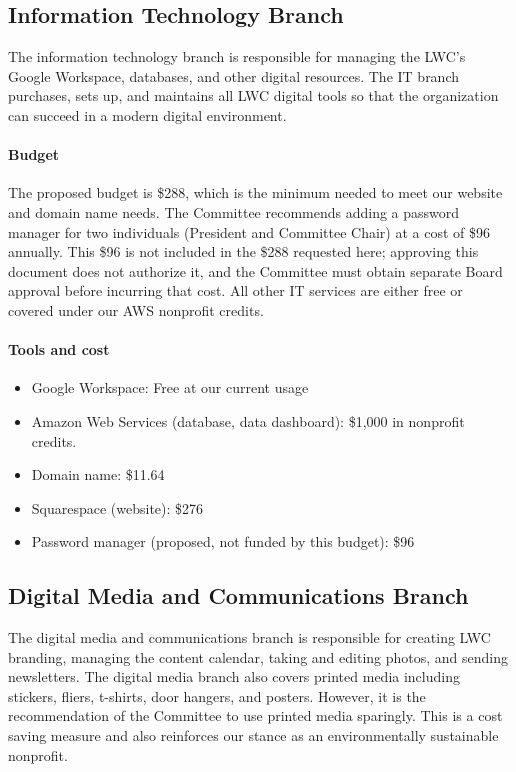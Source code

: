\documentclass[letterpaper,11pt,leqno]{article}
\begin{document}
\subsection{Information Technology Branch}\label{s:itBranch}
The information technology branch is responsible for managing the LWC's Google Workspace, databases, and other digital resources. The IT branch purchases, sets up, and maintains all LWC digital tools so that
the organization can succeed in a modern digital environment.

\paragraph{Budget} The proposed budget is \$288, which is the minimum needed to meet our website and domain name needs. The Committee recommends adding a password manager for two individuals (President and Committee Chair) at a cost of \$96 annually. This \$96 is not included in the \$288 requested here; approving this document does not authorize it, and the Committee must obtain separate Board approval before incurring that cost. All other IT services are either free or covered under our AWS nonprofit credits.
\paragraph{Tools and cost}
\begin{itemize}
    \item Google Workspace: Free at our current usage
    \item Amazon Web Services (database, data dashboard): \$1,000 in nonprofit credits.
    \item Domain name: \$11.64
    \item Squarespace (website): \$276\
    \item Password manager (proposed, not funded by this budget): \$96
\end{itemize}

\subsection{Digital Media and Communications Branch}\label{s:dmBranch}
The digital media and communications branch is responsible for creating LWC branding, managing the content calendar, taking and editing photos, and sending newsletters.
The digital media branch also covers printed media including stickers, fliers, t-shirts, door hangers, and posters. However, it is the recommendation of the Committee to use
printed media sparingly. This is a cost saving measure and also reinforces our stance as an environmentally sustainable nonprofit.
\end{document}
